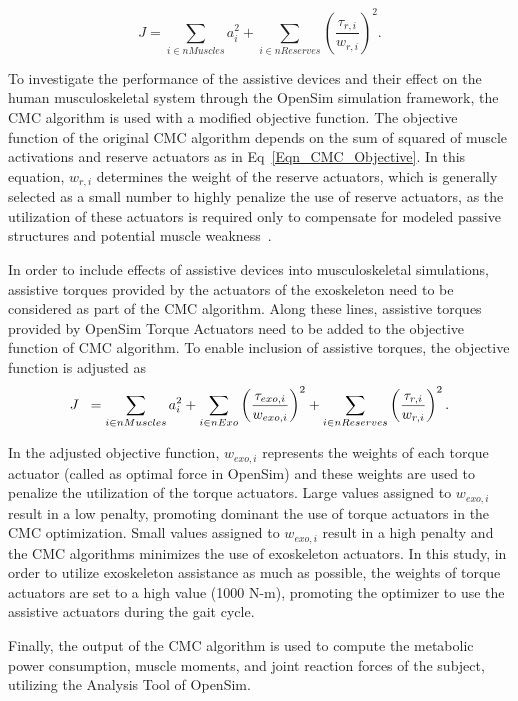 \documentclass[10pt,letterpaper]{article}
\begin{document}
\begin{equation}\label{Eqn_CMC_Objective}
J = \sum_{i\in nMuscles} a_{i}^{2} + \sum_{i \in nReserves} (\frac{\tau_{r,i}}{w_{r,i}})^2.
\end{equation}


To investigate the performance of the assistive devices and their effect on the human musculoskeletal system through the OpenSim simulation framework, the CMC algorithm is used with a modified objective function. The objective function of the original CMC algorithm  depends on the sum of squared of muscle activations and reserve actuators as in Eq~\ref{Eqn_CMC_Objective}. In this equation, $w_{r,i}$ determines the weight of the reserve actuators, which is generally selected as a small number to highly penalize the use of reserve actuators, as the utilization of these actuators is required only to compensate for modeled passive structures and potential muscle weakness~\cite{Dembia2017}.

In order to include effects of assistive devices into musculoskeletal simulations, assistive torques provided by the actuators of the exoskeleton need to be considered as part of the CMC algorithm. Along these lines, assistive torques provided by OpenSim Torque Actuators need to be added to the objective function of CMC algorithm. To enable inclusion of assistive torques,  the objective function is adjusted as
%
\begin{equation}\label{Eqn_CMC_Assisted_Obj_Func}
	J \hspace{2mm}  = \sum_{i\in nMuscles} a_{i}^{2} + \sum_{i \in nExo} \left(\frac{\tau_{exo,i}}{w_{exo,i}}\right)^{2} +  \sum_{i \in nReserves} \left(\frac{\tau_{r,i}}{w_{r,i}}\right)^2.
\end{equation}

In the adjusted objective function, $w_{exo,i}$ represents the weights of each torque actuator (called as optimal force in OpenSim) and these weights are used to penalize the utilization of the torque actuators. Large values assigned to $w_{exo,i}$ result in a low penalty, promoting dominant the use of torque actuators in the CMC optimization. Small values assigned to $w_{exo,i}$ result in a high penalty and the CMC algorithms minimizes the use of exoskeleton actuators. In this study, in order to utilize exoskeleton assistance as much as possible, the weights of  torque actuators are set to a high value (1000 N-m), promoting the optimizer to use the assistive actuators during the gait cycle.


Finally, the output of the CMC algorithm is used to compute the metabolic power consumption, muscle moments, and joint reaction forces of the subject, utilizing the Analysis Tool of OpenSim.
\end{document}
